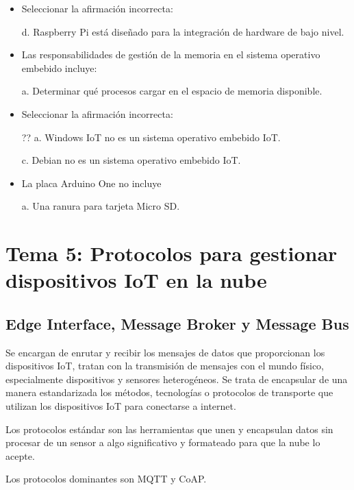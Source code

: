 \documentclass[12pt]{report} %
\begin{document}
\begin{itemize}
	\item Seleccionar la afirmación incorrecta:
	
	d. Raspberry Pi está diseñado para la integración de hardware de bajo nivel.
	
	\item Las responsabilidades de gestión de la memoria en el sistema operativo embebido incluye:
	
	a. Determinar qué procesos cargar en el espacio de memoria disponible.
	
	\item Seleccionar la afirmación incorrecta:
	
	?? a. Windows IoT no es un sistema operativo embebido IoT.
	
	c. Debian no es un sistema operativo embebido IoT. 
	
	\item La placa Arduino One no incluye
	
	a. Una ranura para tarjeta Micro SD.
\end{itemize}


\chapter{Tema 5: Protocolos para gestionar dispositivos IoT en la nube}

\section{Edge Interface, Message Broker y Message Bus}

Se encargan de enrutar y recibir los mensajes de datos que proporcionan los dispositivos IoT, tratan con la transmisión de mensajes con el mundo físico, especialmente dispositivos y sensores heterogéneos. Se trata de encapsular de una manera estandarizada los métodos, tecnologías o protocolos de transporte que utilizan los dispositivos IoT para conectarse a internet.

Los protocolos estándar son las herramientas que unen y encapsulan datos sin procesar de un sensor a algo significativo y formateado para que la nube lo acepte.

Los protocolos dominantes son MQTT y CoAP.
\end{document}
